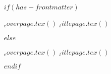 $if(has-frontmatter)$
\begin{frontmatter}
\begin{titlepage}
$_coverpage.tex()$%
$_titlepage.tex()$
  
\end{titlepage}
\setcounter{page}{1}
\end{frontmatter}
$else$
\begin{titlepage}
$_coverpage.tex()$%
%
$_titlepage.tex()$
  
\end{titlepage}
$endif$

  
